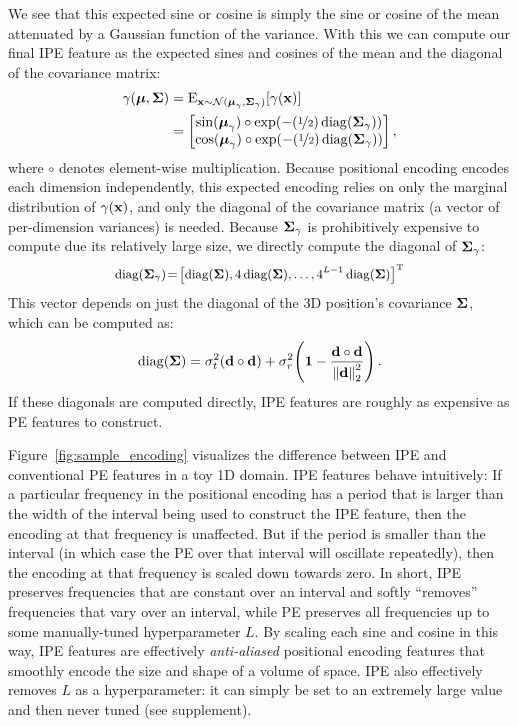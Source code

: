 \documentclass[10pt,twocolumn,letterpaper]{article}
\begin{document}
We see that this expected sine or cosine is simply the sine or cosine of the mean attenuated by a Gaussian function of the variance. With this we can compute our final IPE feature as the expected sines and cosines of the mean and the diagonal of the covariance matrix:
\begin{align}
\gamma(\boldsymbol{\mu}, \covmat) 
&= \operatorname{E}_{\position \sim \mathcal N(\boldsymbol{\mu}_\gamma, \covmat_\gamma)}\left[\gamma(\position)\right] \\
&= \begin{bmatrix} \sin(\boldsymbol{\mu}_\gamma) \circ \exp\left(-(\nicefrac{1}{2}) \operatorname{diag}\left(\covmat_\gamma\right)\right)
\\ \cos(\boldsymbol{\mu}_\gamma) \circ \exp\left(-(\nicefrac{1}{2}) \operatorname{diag}\left(\covmat_\gamma\right)\right)\end{bmatrix}\, , \label{eq:ipe}
\end{align}
where $\circ$ denotes element-wise multiplication. 
Because positional encoding encodes each dimension independently, this expected encoding relies on only the marginal distribution of $\gamma(\mathbf{x})$, and only the diagonal of the covariance matrix (a vector of per-dimension variances) is needed.
Because $\boldsymbol{\Sigma}_\gamma$ is prohibitively expensive to compute due its relatively large size, we directly compute the diagonal of $\boldsymbol{\Sigma}_\gamma$:
\begin{equation}
\small \operatorname{diag}(\covmat_\gamma)\!=\!\left[
\operatorname{diag}(\covmat), 4 \operatorname{diag}(\covmat), \ldots, 4^{L-1} \operatorname{diag}(\covmat) \right]^\transpose
\end{equation}
This vector depends on just the diagonal of the 3D position's covariance $\boldsymbol{\Sigma}$, which can be computed as:
\begin{equation}
\operatorname{diag}(\covmat) = \sigma_\zval^2 \left(\raydir \circ \raydir\right) + \sigma_{r}^2 \left(\mathbf{1} - \frac{\raydir \circ \raydir}{\norm{\raydir}_2^2} \right)\,.
\end{equation}
If these diagonals are computed directly, IPE features are roughly as expensive as PE features to construct.

Figure~\ref{fig:sample_encoding} visualizes the difference between IPE and conventional PE features in a toy 1D domain. IPE features behave intuitively: If a particular frequency in the positional encoding has a period that is larger than the width of the interval being used to construct the IPE feature, then the encoding at that frequency is unaffected. But if the period is smaller than the interval (in which case the PE over that interval will oscillate repeatedly), then the encoding at that frequency is scaled down towards zero. In short, IPE preserves frequencies that are constant over an interval and softly ``removes'' frequencies that vary over an interval, while PE preserves all frequencies up to some manually-tuned hyperparameter $L$. By scaling each sine and cosine in this way, IPE features are effectively \emph{anti-aliased} positional encoding features that smoothly encode the size and shape of a volume of space. IPE also effectively removes $L$ as a hyperparameter: it can simply be set to an extremely large value and then never tuned (see supplement).
\end{document}
